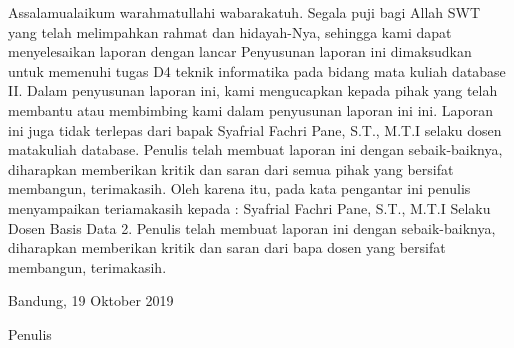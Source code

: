 \begin{acknowledgements}
Assalamualaikum warahmatullahi wabarakatuh. Segala puji bagi Allah SWT yang telah melimpahkan rahmat dan hidayah-Nya, sehingga kami dapat menyelesaikan laporan dengan lancar
Penyusunan laporan ini dimaksudkan untuk memenuhi tugas D4 teknik informatika pada bidang mata kuliah database II. Dalam penyusunan laporan ini, kami mengucapkan kepada pihak yang telah membantu atau membimbing kami dalam penyusunan laporan ini ini. Laporan ini juga tidak terlepas dari bapak Syafrial Fachri Pane, S.T., M.T.I selaku dosen matakuliah database. Penulis telah membuat laporan ini dengan sebaik-baiknya, diharapkan memberikan kritik dan saran dari semua pihak yang bersifat membangun, terimakasih.
Oleh karena itu, pada kata pengantar ini penulis menyampaikan teriamakasih kepada : Syafrial Fachri Pane, S.T., M.T.I Selaku Dosen Basis Data 2.
Penulis telah membuat laporan ini dengan sebaik-baiknya, diharapkan memberikan kritik dan saran dari bapa dosen yang bersifat membangun, terimakasih.

\begin{raggedleft}
\vspace{9ex}
Bandung, 19 Oktober 2019

Penulis

\end{raggedleft}

\end{acknowledgements}